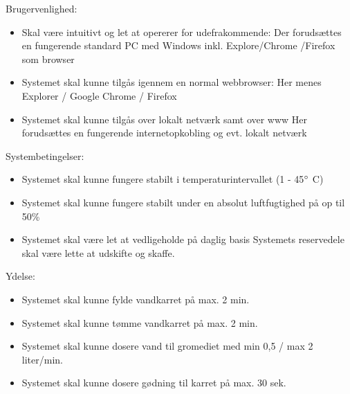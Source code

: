 Brugervenlighed:
\begin{itemize}
	\item Skal være intuitivt og let at opererer for udefrakommende:
	Der forudsættes en fungerende standard PC med Windows inkl. Explore/Chrome	/Firefox som browser

	\item Systemet skal kunne tilgås igennem en normal webbrowser:
		Her menes Explorer / Google Chrome / Firefox
	\item Systemet skal kunne tilgås over lokalt netværk samt over www
		Her forudsættes en fungerende internetopkobling og evt. lokalt netværk
\end{itemize}

Systembetingelser:
\begin{itemize}
	\item Systemet skal kunne fungere stabilt i temperaturintervallet (1 - 45$\degree$ C)
	\item Systemet skal kunne fungere stabilt under en absolut luftfugtighed på op til 50\%
	\item Systemet skal være let at vedligeholde på daglig basis
		Systemets reservedele skal være lette at udskifte og skaffe.
\end{itemize}

Ydelse:
\begin{itemize}
	\item Systemet skal kunne fylde vandkarret på max. 2 min.
	\item Systemet skal kunne tømme vandkarret på max. 2 min.
	\item Systemet skal kunne dosere vand til gromediet med min 0,5 / max 2 liter/min.
	\item Systemet skal kunne dosere gødning til karret på max. 30 sek.
\end{itemize}
